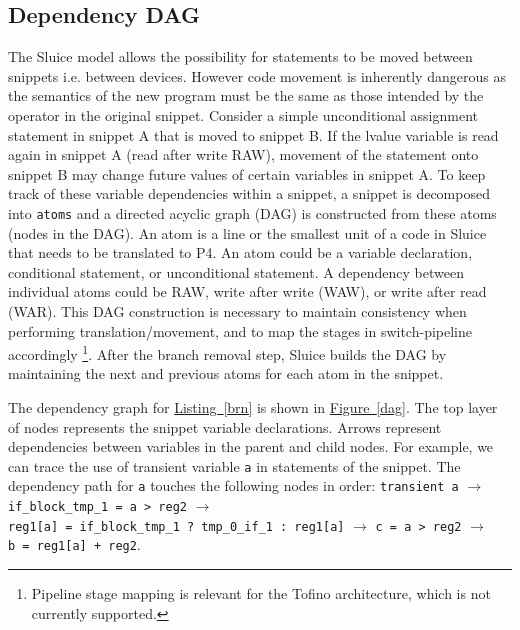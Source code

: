 \documentclass[12pt, oneside]{article}
\newcommand{\irref}[2]{\hyperref[#2]{#1~\ref{#2}}}
\begin{document}
\subsection{Dependency DAG}
The Sluice model allows the possibility for statements to be moved between snippets i.e. between devices. However code movement is inherently dangerous as the semantics of the new program must be the same as those intended by the operator in the original snippet. Consider a simple unconditional assignment statement in snippet A that is moved to snippet B. If the lvalue variable is read again in snippet A (read after write RAW), movement of the statement onto snippet B may change future values of certain variables in snippet A.  To keep track of these variable dependencies within a snippet, a snippet is decomposed into \texttt{atoms} and a directed acyclic graph (DAG) is constructed from these atoms (nodes in the DAG). An atom is a line or the smallest unit of a code in Sluice that needs to be translated to P4. An atom could be a variable declaration, conditional statement, or unconditional statement. A dependency between individual atoms could be RAW, write after write (WAW), or write after read (WAR). This DAG construction is necessary to maintain consistency when performing translation/movement, and to map the stages in switch-pipeline accordingly \footnote{Pipeline stage mapping is relevant for the Tofino architecture, which is not currently supported.}. After the branch removal step, Sluice builds the DAG by maintaining the next and previous atoms for each atom in the snippet. 

The dependency graph for \irref{Listing}{brn} is shown in \irref{Figure}{dag}. The top layer of nodes represents the snippet variable declarations. Arrows represent dependencies between variables in the parent and child nodes. For example, we can trace the use of transient variable \texttt{a} in statements of the snippet. The dependency path for \texttt{a} touches the following nodes in order: \texttt{transient a} $\longrightarrow$ \texttt{if\_block\_tmp\_1 = a > reg2} $\longrightarrow$ \\ \texttt{reg1[a] = if\_block\_tmp\_1 ? tmp\_0\_if\_1 : reg1[a]} $\longrightarrow$ \texttt{c = a > reg2} $\longrightarrow$ \\ \texttt{b = reg1[a] + reg2}.
\end{document}

